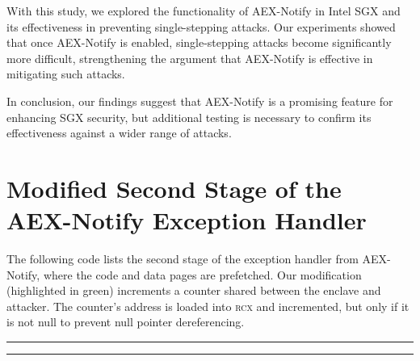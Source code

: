 \documentclass{llncs}
\begin{document}
With this study, we explored the functionality of AEX-Notify in Intel SGX and
its effectiveness in preventing single-stepping attacks.
Our experiments showed that once AEX-Notify is enabled, single-stepping attacks become significantly more difficult, strengthening the argument that AEX-Notify is effective in mitigating such attacks.

In conclusion, our findings suggest that AEX-Notify is a promising feature for enhancing SGX security,
but additional testing is necessary to confirm its effectiveness against a wider range of attacks.


%


\backmatter
\appendix

\section{Modified Second Stage of the AEX-Notify Exception Handler}

The following code lists the second stage of the exception handler from AEX-Notify,
where the code and data pages are prefetched.
Our modification (highlighted in green) increments a counter shared between the enclave and attacker.
The counter's address is loaded into \textsc{rcx} and incremented, but only if it is not null to prevent null pointer dereferencing.

\noindent
\rule{0.8\textwidth}{0.4pt}
\vspace{-0.5em}
%
\vspace{-1.1em}
%
\vspace{-1.1em}

\vspace{-1em}
\rule{0.8\textwidth}{0.4pt}
\end{document}
